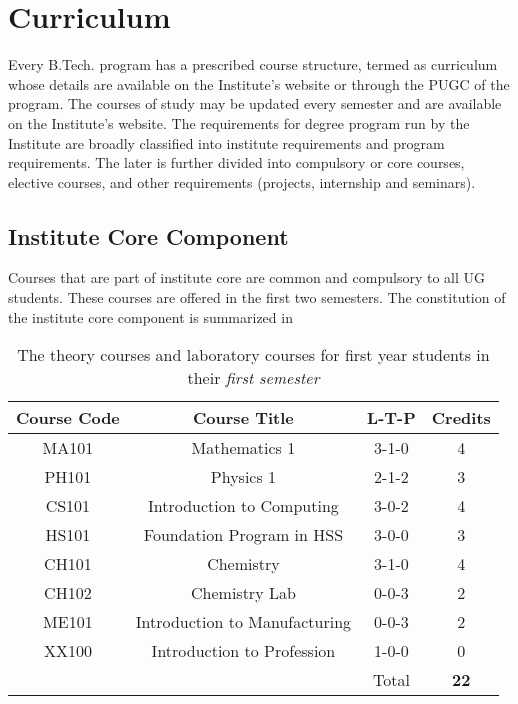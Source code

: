 \section{Curriculum}

Every B.Tech. program has a prescribed course structure, termed as curriculum whose details are available on the Institute's website or through the PUGC of the program. The courses of study may be updated every semester and are available on the Institute's website. The requirements for degree program run by the Institute are broadly classified into institute requirements and program requirements. The later is further divided into compulsory or core courses, elective courses, and other requirements (projects, internship and seminars). 

\subsection{Institute Core Component}

Courses that are part of institute core are common and compulsory to all UG students. These courses are offered in the first two semesters. The constitution of the institute core component is summarized in 

\begin{table}[!htbp]
    \centering
    \begin{tabular}{c c c c}
        \toprule
        \textbf{Course Code} &  \textbf{Course Title} & \textbf{L-T-P} & \textbf{Credits} \\
        \midrule
        MA101   & Mathematics 1                 & 3-1-0 & 4 \\
        PH101   & Physics 1                     & 2-1-2 & 3 \\
        CS101   & Introduction to Computing     & 3-0-2 & 4 \\
        HS101   & Foundation Program in HSS     & 3-0-0 & 3 \\
        CH101   & Chemistry                     & 3-1-0 & 4 \\
        CH102   & Chemistry Lab                 & 0-0-3 & 2 \\
        ME101   & Introduction to Manufacturing & 0-0-3 & 2 \\
        XX100   & Introduction to Profession    & 1-0-0 & 0 \\
        \midrule
        {}      & {}                            & Total & \textbf{22} \\
        \bottomrule
    \end{tabular}
    
    \caption{The theory courses and laboratory courses for first year students in their \textit{first semester}}
    \label{tab:first semester courses}
    
\end{table}

